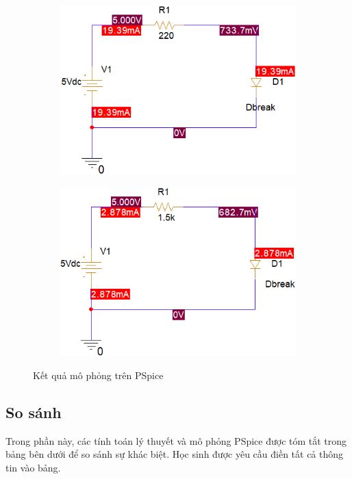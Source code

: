 \begin{figure}[h]
    \centering
    \begin{subfigure}{0.49\textwidth}
        \centering
        \includegraphics[width=0.8\linewidth]{graphics/ex1/f1.PNG}
    \end{subfigure}
    \hfill
    \begin{subfigure}{0.49\textwidth}
        \centering
        \includegraphics[width=0.8\linewidth]{graphics/ex1/f2.PNG}
    \end{subfigure}
    \caption{Kết quả mô phỏng trên PSpice}
\end{figure}

\subsection{So sánh}    

Trong phần này, các tính toán lý thuyết và mô phỏng PSpice được tóm tắt trong bảng bên dưới để so sánh sự khác biệt. Học sinh được yêu cầu điền tất cả thông tin vào bảng.

